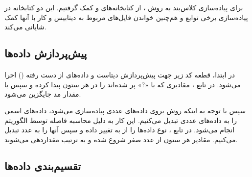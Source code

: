 \documentclass[a4paper,12pt]{article}
\begin{document}
برای پیاده‌سازی کلاس‌بند به روش ، از کتابخانه‌های  و  کمک گرفتیم. این دو کتابخانه در پیاده‌سازی برخی توابع و هم‌چنین خواندن فایل‌های مربوط به دیتابیس و کار با آنها کمک شایانی می‌کند.

\subsection{پیش‌پردازش داده‌ها}
\paragraph{}
در ابتدا، قطعه کد زیر جهت پیش‌پردازش دیتاست و داده‌های از دست رفته
 () اجرا می‌شود.
  در تابع ، مقادیری که با «?» پر شده‌اند را در هر ستون پیدا کرده و سپس با مقدار مد جایگزین می‌شود.

\begin{flushleft}
\end{flushleft}

سپس با توجه به اینکه روش  بروی داده‌های عددی پیاده‌سازی می‌شود، داده‌های اسمی را به داده‌های عددی تبدیل می‌کنیم. این کار به دلیل محاسبه فاصله توسط الگوریتم  انجام می‌شود.
در تابع ، نوع داده‌ها را از  به  تغییر داده و سپس آنها را به عدد تبدیل می‌کنیم. مقادیر هر ستون از عدد صفر شروع شده و به ترتیب مقداردهی می‌شوند.

\begin{flushleft}
\end{flushleft}

\subsection{تقسیم‌بندی داده‌ها}	
\end{document}
